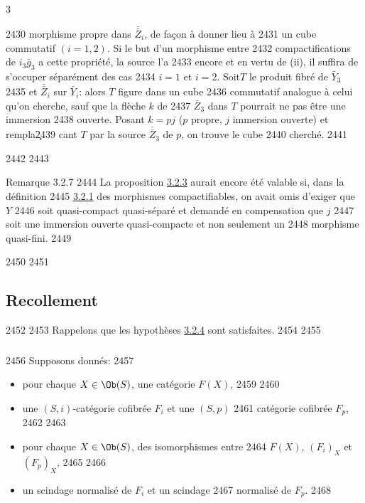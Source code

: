 3	\documentclass[10pt]{../fichiers-configuration-latex/smfart}
\begin{document}
\begin{enumerate}
  2430	morphisme propre dans $\bar{\bar{Z}}_i$, de façon à donner lieu à
  2431	un cube commutatif $(i=1,2)$. Si le but d'un morphisme entre
  2432	compactifications de $i_3\bar{g}_3$ a cette propriété, la source l'a
  2433	encore et en vertu de (ii), il suffira de s'occuper séparément des cas
  2434	$i=1$ et $i=2$. Soit\pageoriginale $T$ le produit fibré de $\bar{Y}_3$
  2435	et $\bar{\bar{Z}}_i$ sur $\bar{Y}_i$: alors $T$ figure dans un cube
  2436	commutatif analogue à celui qu'on cherche, sauf que la flèche $k$ de
  2437	$\bar{Z}_3$ dans $T$ pourrait ne pas être une immersion
  2438	ouverte. Posant $k=pj$ ($p$ propre, $j$ immersion ouverte) et rempla\c
  2439	cant $T$ par la source $\bar{\bar{Z}}_3$ de $p$, on trouve le cube
  2440	cherché.
  2441	\end{enumerate}
  2442	
  2443	\begin{enonce*}{Remarque 3.2.7}
  2444	La proposition \hyperref[XVII.prop3.2.3]{3.2.3} aurait encore été valable si, dans la définition
  2445	\hyperref[XVII.def3.2.1]{3.2.1} des morphismes compactifiables, on avait omis d'exiger que $Y$
  2446	soit quasi-compact quasi-séparé et demandé en compensation que $j$
  2447	soit une immersion ouverte quasi-compacte et non seulement un
  2448	morphisme quasi-fini.
  2449	\end{enonce*}
  2450	
  2451	\subsection{Recollement}
  2452	
  2453	Rappelons que les hypothèses \hyperref[XVII.subsubsec3.2.4]{3.2.4} sont satisfaites.
  2454	
  2455	\subsubsection{}
  2456	Supposons donnés:
  2457	\begin{itemize}
  2458	\item[$\alpha$)] pour chaque $X\in \Ob (S)$, une catégorie $F(X)$,
  2459	
  2460	\item[$\beta$)] une $(S,i)$-catégorie cofibrée $F_i$ et une $(S,p)$
  2461	catégorie cofibrée $F_{p}$,
  2462	
  2463	\item[$\gamma$)] pour chaque $X\in \Ob(S)$, des isomorphismes entre
  2464	$F(X)$, $(F_{i})_X$ et $(F_{p})_X$,
  2465	
  2466	\item[$\delta$)] un scindage normalisé de $F_{i}$ et un scindage
  2467	normalisé de $F_{p}$.
  2468	\end{itemize}
\end{document}
